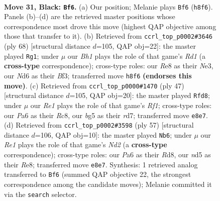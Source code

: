 \documentclass[11pt]{article}
\begin{document}
\clearpage

\begin{figure}[p]\centering
\begin{subfigure}{0.46\textwidth}\centering
\resizebox{\linewidth}{!}{%
\newchessgame
\chessboard[
  setfen={r2kr2b/2pb4/pp1n4/P2N1pB1/4p2R/1B3N2/1P2KPP1/R7 b - - 1 31},
  showmover=false,
  pgfstyle=straightmove, color=movearrow, markmove={h8-f6}
]}
\caption{}
\end{subfigure}\hfill
\begin{subfigure}{0.46\textwidth}\centering
\resizebox{\linewidth}{!}{%
\newchessgame
\chessboard[
  setfen={8/pprbpp2/3p1n2/P4Pk1/1PP1P2r/R3NBK1/8/3R4 w - - 5 35},
  showmover=false,
  pgfstyle=straightmove, color=movearrow, markmove={d1-g1}
]}
\caption{}
\end{subfigure}
\\[4pt]
\begin{subfigure}{0.46\textwidth}\centering
\resizebox{\linewidth}{!}{%
\newchessgame
\chessboard[
  setfen={2r2r1k/p2R3p/6p1/3N1pb1/6Pn/3BP1K1/P6P/5R2 b - - 7 24},
  showmover=false,
  pgfstyle=straightmove, color=movearrow, markmove={f8-d8}
]}
\caption{}
\end{subfigure}\hfill
\begin{subfigure}{0.46\textwidth}\centering
\resizebox{\linewidth}{!}{%
\newchessgame
\chessboard[
  setfen={1kbrr3/nppn4/8/1P1Rp2p/5p1N/4P1P1/1B3PB1/R5K1 b - - 7 29},
  showmover=false,
  pgfstyle=straightmove, color=movearrow, markmove={d7-b6}
]}
\caption{}
\end{subfigure}
\caption{\textbf{Move 31, Black: \texttt{Bf6}.} (a) Our position; Melanie plays \texttt{Bf6} (\texttt{h8f6}). Panels (b)--(d) are the retrieved master positions whose correspondence most drove this move (highest QAP objective among those that transfer to it). (b) Retrieved from \texttt{ccrl\_top\_p0002\#3646} (ply 68) [structural distance $d$=105, QAP obj=22]: the master played \texttt{Rg1}; under $\mu$ our \emph{Bh1} plays the role of that game's \emph{Rd1} (a \textbf{cross-type} correspondence); cross-type roles: our \emph{R}e8 as their \emph{N}e3, our \emph{N}d6 as their \emph{B}f3; transferred move \texttt{h8f6} \textbf{(endorses this move)}. (c) Retrieved from \texttt{ccrl\_top\_p0000\#1470} (ply 47) [structural distance $d$=105, QAP obj=20]: the master played \texttt{Rfd8}; under $\mu$ our \emph{Re1} plays the role of that game's \emph{Rf1}; cross-type roles: our \emph{P}a6 as their \emph{R}c8, our \emph{b}g5 as their \emph{r}d7; transferred move \texttt{e8e7}. (d) Retrieved from \texttt{ccrl\_top\_p0002\#3598} (ply 57) [structural distance $d$=106, QAP obj=10]: the master played \texttt{Nb6}; under $\mu$ our \emph{Re1} plays the role of that game's \emph{Nd2} (a \textbf{cross-type} correspondence); cross-type roles: our \emph{P}a6 as their \emph{R}d8, our \emph{n}d5 as their \emph{R}e8; transferred move \texttt{e8e7}. Synthesis: 1 retrieved analog transferred to \texttt{Bf6} (summed QAP objective 22, the strongest correspondence among the candidate moves); Melanie committed it via the \texttt{search} selector.}
\label{fig:thought-m61}
\end{figure}
\end{document}
